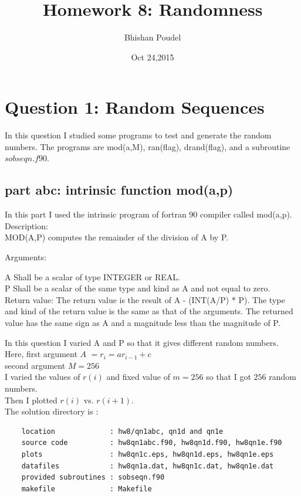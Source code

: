 \documentclass[11pt,a4paper,english]{article}
\title{Homework 8: Randomness}
\author{Bhishan Poudel}
\date{Oct 24,2015}
\begin{document}
\maketitle
\tableofcontents
\listoffigures
\clearpage


\section{Question 1: Random Sequences }
In this question I studied some programs to test and generate the random numbers.
The programs are mod(a,M), ran(flag), drand(flag), and a subroutine $sobseqn.f90$.\\

	
	\subsection{part abc: intrinsic function mod(a,p)}
	
	
	In this part I used the intrinsic program of fortran $90$ compiler called
	mod(a,p).\\
	Description:\\
    MOD(A,P) computes the remainder of the division of A by P.
    
    Arguments:

    A 	Shall be a scalar of type INTEGER or REAL.\\
    P 	Shall be a scalar of the same type and kind as A and not equal to zero.\\

    Return value:
    The return value is the result of A - (INT(A/P) * P). 
    The type and kind of the return value is the same as that of the arguments. 
    The returned value has the same sign as A and a magnitude less than the magnitude of P.
    
    In this question I varied A and P so that it gives different random numbers.\\
    Here, first argument $ A $ $=r_{i} = ar_{i-1}+c $\\
    second argument $ M = 256$\\
    I varied the values of $r(i)$ and fixed value of $m=256$ so that I got $256$ random numbers.\\
    Then I plotted $r(i)$ vs. $r(i+1)$.\\
      

	The solution directory is :\\
	\begin{verbatim}
	location             : hw8/qn1abc, qn1d and qn1e 
	source code          : hw8qn1abc.f90, hw8qn1d.f90, hw8qn1e.f90
	plots                : hw8qn1c.eps, hw8qn1d.eps, hw8qn1e.eps
	datafiles            : hw8qn1a.dat, hw8qn1c.dat, hw8qn1e.dat
	provided subroutines : sobseqn.f90 
	makefile             : Makefile
	\end{verbatim}
	
\end{document}
